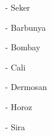 \documentclass{beamer}
\begin{document}
\begin{frame}
\begin{columns}
\begin{column}{0.25\textwidth}
\begin{scriptsize}
\begin{itemize}
\item[-] Seker
\item[-] Barbunya
\item[-] Bombay
\item[-] Cali
\item[-] Dermosan
\item[-] Horoz
\item[-] Sira
\end{itemize}
\end{scriptsize}
\end{column}
\end{columns}
\end{frame}
\end{document}
